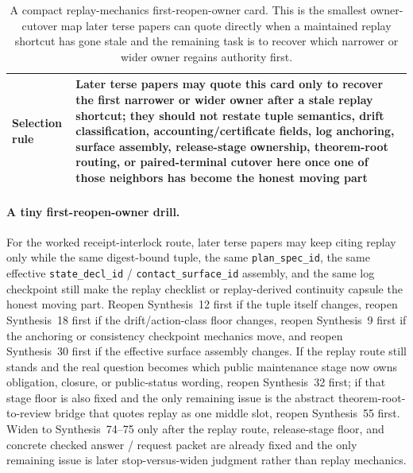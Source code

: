 \documentclass[11pt]{article}
\begin{document}
\begin{table}[t]
\begin{tabularx}{\linewidth}{@{}lX@{}}
Selection rule & Later terse papers may quote this card only to recover the first narrower or wider owner after a stale replay shortcut; they should not restate tuple semantics, drift classification, accounting/certificate fields, log anchoring, surface assembly, release-stage ownership, theorem-root routing, or paired-terminal cutover here once one of those neighbors has become the honest moving part \\
\bottomrule
\end{tabularx}
\caption{A compact replay-mechanics first-reopen-owner card. This is the smallest owner-cutover map later terse papers can quote directly when a maintained replay shortcut has gone stale and the remaining task is to recover which narrower or wider owner regains authority first.}
\label{tab:replay-first-reopen-owner-card}
\end{table}

\paragraph{A tiny first-reopen-owner drill.} For the worked receipt-interlock route, later terse papers may keep citing replay only while the same digest-bound tuple, the same \texttt{plan\_spec\_id}, the same effective \texttt{state\_decl\_id} / \texttt{contact\_surface\_id} assembly, and the same log checkpoint still make the replay checklist or replay-derived continuity capsule the honest moving part. Reopen Synthesis~12 first if the tuple itself changes, reopen Synthesis~18 first if the drift/action-class floor changes, reopen Synthesis~9 first if the anchoring or consistency checkpoint mechanics move, and reopen Synthesis~30 first if the effective surface assembly changes. If the replay route still stands and the real question becomes which public maintenance stage now owns obligation, closure, or public-status wording, reopen Synthesis~32 first; if that stage floor is also fixed and the only remaining issue is the abstract theorem-root-to-review bridge that quotes replay as one middle slot, reopen Synthesis~55 first. Widen to Synthesis~74--75 only after the replay route, release-stage floor, and concrete checked answer / request packet are already fixed and the only remaining issue is later stop-versus-widen judgment rather than replay mechanics.\cite{series:workedexample,series:receiptitems,series:planstateequiv,series:transparencyprimitives,series:deployedsurfaces,series:releasespine,series:seriesspines,series:pairedterminalcitationdiscipline,series:pairedterminalcutoverrules}
\end{document}
